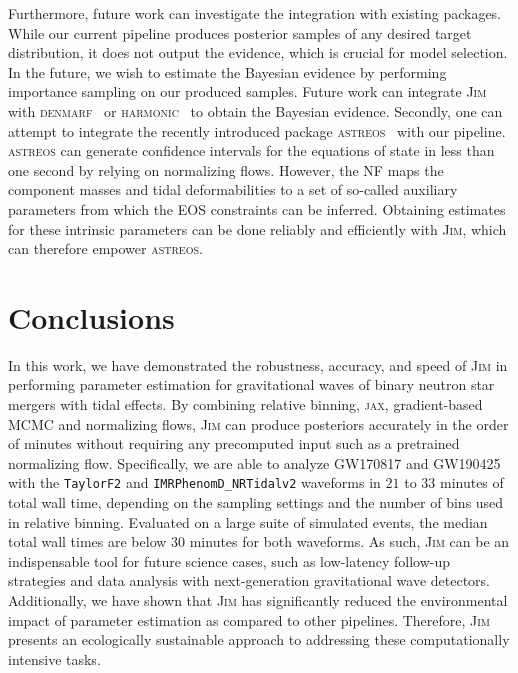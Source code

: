 \documentclass[prd,twocolumn,a4paper,floatfix,nofootinbib,preprintnumbers,superscriptaddress]{revtex4-1}
\begin{document}
Furthermore, future work can investigate the integration with existing packages. While our current pipeline produces posterior samples of any desired target distribution, it does not output the evidence, which is crucial for model selection. In the future, we wish to estimate the Bayesian evidence by performing importance sampling on our produced samples. Future work can integrate \textsc{Jim} with \textsc{denmarf}~\cite{lo2023denmarf} or \textsc{harmonic}~\cite{mcewen2023machine, SpurioMancini:2022vcy, polanska2024learned} to obtain the Bayesian evidence. Secondly, one can attempt to integrate the recently introduced package \textsc{astreos}~\cite{McGinn:2024nkd} with our pipeline. \textsc{astreos} can generate confidence intervals for the equations of state in less than one second by relying on normalizing flows. However, the \ac{NF} maps the component masses and tidal deformabilities to a set of so-called auxiliary parameters from which the \ac{EOS} constraints can be inferred. Obtaining estimates for these intrinsic parameters can be done reliably and efficiently with \textsc{Jim}, which can therefore empower \textsc{astreos}. 

\section{Conclusions}\label{sec:conclusions}

In this work, we have demonstrated the robustness, accuracy, and speed of \textsc{Jim} in performing parameter estimation for gravitational waves of binary neutron star mergers with tidal effects. By combining relative binning, \textsc{jax}, gradient-based \ac{MCMC} and normalizing flows, \textsc{Jim} can produce posteriors accurately in the order of minutes without requiring any precomputed input such as a pretrained normalizing flow. Specifically, we are able to analyze GW170817 and GW190425 with the \texttt{TaylorF2} and \texttt{IMRPhenomD\_NRTidalv2} waveforms in $21$ to $33$ minutes of total wall time, depending on the sampling settings and the number of bins used in relative binning. Evaluated on a large suite of simulated events, the median total wall times are below $30$ minutes for both waveforms.  As such, \textsc{Jim} can be an indispensable tool for future science cases, such as low-latency follow-up strategies and data analysis with next-generation gravitational wave detectors. Additionally, we have shown that \textsc{Jim} has significantly reduced the environmental impact of parameter estimation as compared to other pipelines. Therefore, \textsc{Jim} presents an ecologically sustainable approach to addressing these computationally intensive tasks. 
\end{document}
